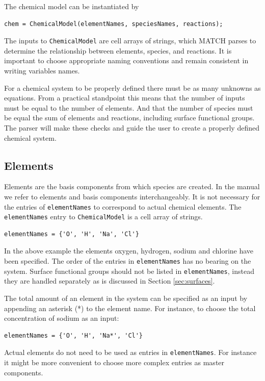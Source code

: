 \documentclass{article}
\begin{document}
The chemical model can be instantiated by
\begin{lstlisting}
chem = ChemicalModel(elementNames, speciesNames, reactions);
\end{lstlisting}
The inputs to \verb|ChemicalModel| are cell arrays of strings, which MATCH parses to determine the relationship between elements, species, and reactions. It is important to choose appropriate naming conventions and remain consistent in writing variables names.

For a chemical system to be properly defined there must be as many unknowns as equations. From a practical standpoint this means that the number of inputs must be equal to the number of elements. And that the number of species must be equal the sum of elements and reactions, including surface functional groups. The parser will make these checks and guide the user to create a properly defined chemical system. 

\subsection{Elements}

Elements are the basis components from which species are created. In the manual we refer to elements and basis components interchangeably. It is not necessary for the entries of \verb|elementNames| to correspond to actual chemical elements. The \verb|elementNames| entry to \verb|ChemicalModel| is a cell array of strings.

\begin{lstlisting}
elementNames = {'O', 'H', 'Na', 'Cl'}
\end{lstlisting}
In the above example the elements oxygen, hydrogen, sodium and chlorine have been specified. The order of the entries in \verb|elementNames| has no bearing on the system. Surface functional groups should not be listed in \verb|elementNames|, instead they are handled separately as is discussed in Section \ref{sec:surfaces}.

The total amount of an element in the system can be specified as an input by appending an asterisk (*) to the element name. For instance, to choose the total concentration of sodium as an input:

\begin{lstlisting}
elementNames = {'O', 'H', 'Na*', 'Cl'}
\end{lstlisting}

Actual elements do not need to be used as entries in \verb|elementNames|. For instance it might be more convenient to choose more complex entries as master components. 
\end{document}

